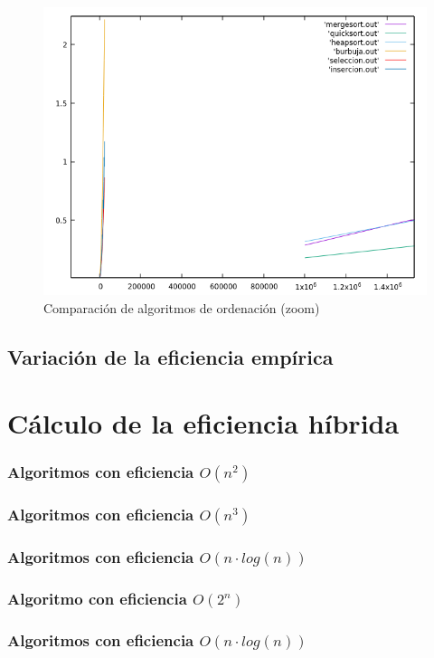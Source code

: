 \documentclass[12pt,spanish]{article}
\begin{document}
\begin{figure}[H]
\centering
\includegraphics[scale=0.75]{empirica_ordenacion_comparacion_zoom.png}
\caption{Comparación de algoritmos de ordenación (zoom)}
\end{figure}
\subsection{Variación de la eficiencia empírica}

\section{Cálculo de la eficiencia híbrida}

\subsubsection{Algoritmos con eficiencia $O(n^2)$}

\subsubsection{Algoritmos con eficiencia $O(n^3)$}

\subsubsection{Algoritmos con eficiencia $O(n \cdot log(n))$}

\subsubsection{Algoritmo con eficiencia $O(2^n)$}

\subsubsection{Algoritmos con eficiencia $O(n \cdot log(n))$}

\end{document}
